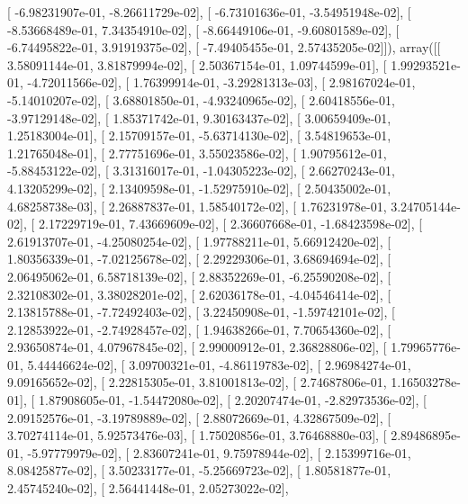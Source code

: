 \documentclass{article}
\begin{document}
       [ -6.98231907e-01,  -8.26611729e-02],
       [ -6.73101636e-01,  -3.54951948e-02],
       [ -8.53668489e-01,   7.34354910e-02],
       [ -8.66449106e-01,  -9.60801589e-02],
       [ -6.74495822e-01,   3.91919375e-02],
       [ -7.49405455e-01,   2.57435205e-02]]), array([[  3.58091144e-01,   3.81879994e-02],
       [  2.50367154e-01,   1.09744599e-01],
       [  1.99293521e-01,  -4.72011566e-02],
       [  1.76399914e-01,  -3.29281313e-03],
       [  2.98167024e-01,  -5.14010207e-02],
       [  3.68801850e-01,  -4.93240965e-02],
       [  2.60418556e-01,  -3.97129148e-02],
       [  1.85371742e-01,   9.30163437e-02],
       [  3.00659409e-01,   1.25183004e-01],
       [  2.15709157e-01,  -5.63714130e-02],
       [  3.54819653e-01,   1.21765048e-01],
       [  2.77751696e-01,   3.55023586e-02],
       [  1.90795612e-01,  -5.88453122e-02],
       [  3.31316017e-01,  -1.04305223e-02],
       [  2.66270243e-01,   4.13205299e-02],
       [  2.13409598e-01,  -1.52975910e-02],
       [  2.50435002e-01,   4.68258738e-03],
       [  2.26887837e-01,   1.58540172e-02],
       [  1.76231978e-01,   3.24705144e-02],
       [  2.17229719e-01,   7.43669609e-02],
       [  2.36607668e-01,  -1.68423598e-02],
       [  2.61913707e-01,  -4.25080254e-02],
       [  1.97788211e-01,   5.66912420e-02],
       [  1.80356339e-01,  -7.02125678e-02],
       [  2.29229306e-01,   3.68694694e-02],
       [  2.06495062e-01,   6.58718139e-02],
       [  2.88352269e-01,  -6.25590208e-02],
       [  2.32108302e-01,   3.38028201e-02],
       [  2.62036178e-01,  -4.04546414e-02],
       [  2.13815788e-01,  -7.72492403e-02],
       [  3.22450908e-01,  -1.59742101e-02],
       [  2.12853922e-01,  -2.74928457e-02],
       [  1.94638266e-01,   7.70654360e-02],
       [  2.93650874e-01,   4.07967845e-02],
       [  2.99000912e-01,   2.36828806e-02],
       [  1.79965776e-01,   5.44446624e-02],
       [  3.09700321e-01,  -4.86119783e-02],
       [  2.96984274e-01,   9.09165652e-02],
       [  2.22815305e-01,   3.81001813e-02],
       [  2.74687806e-01,   1.16503278e-01],
       [  1.87908605e-01,  -1.54472080e-02],
       [  2.20207474e-01,  -2.82973536e-02],
       [  2.09152576e-01,  -3.19789889e-02],
       [  2.88072669e-01,   4.32867509e-02],
       [  3.70274114e-01,   5.92573476e-03],
       [  1.75020856e-01,   3.76468880e-03],
       [  2.89486895e-01,  -5.97779979e-02],
       [  2.83607241e-01,   9.75978944e-02],
       [  2.15399716e-01,   8.08425877e-02],
       [  3.50233177e-01,  -5.25669723e-02],
       [  1.80581877e-01,   2.45745240e-02],
       [  2.56441448e-01,   2.05273022e-02],
\end{document}
